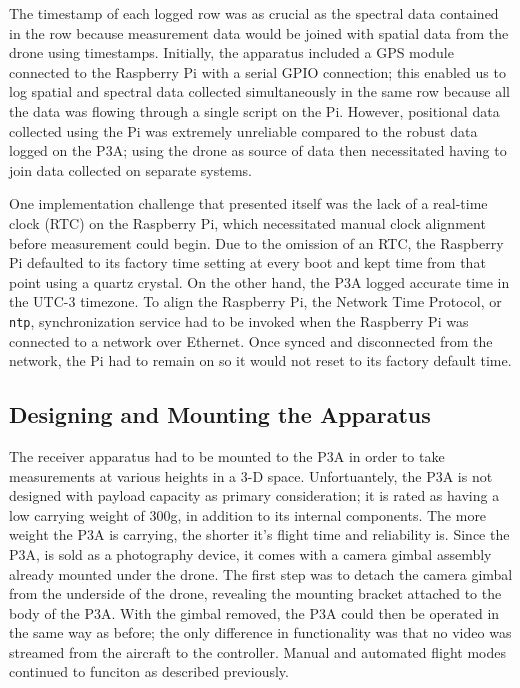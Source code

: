 \documentclass[pageno]{jpaper}
\begin{document}
The timestamp of each logged row was as crucial as the spectral data contained in the row because measurement data would be joined with spatial data from the drone using timestamps. Initially, the apparatus included a GPS module connected to the Raspberry Pi with a serial GPIO connection; this enabled us to log spatial and spectral data collected simultaneously in the same row because all the data was flowing through a single script on the Pi. However, positional data collected using the Pi was extremely unreliable compared to the robust data logged on the P3A; using the drone as source of data then necessitated having to join data collected on separate systems.

 One implementation challenge that presented itself was the lack of a real-time clock (RTC) on the Raspberry Pi, which necessitated manual clock alignment before measurement could begin. Due to the omission of an RTC, the Raspberry Pi defaulted to its factory time setting at every boot and kept time from that point using a quartz crystal. On the other hand, the P3A logged accurate time in the UTC-3 timezone. To align the Raspberry Pi, the Network Time Protocol, or \texttt{ntp}, synchronization service had to be invoked when the Raspberry Pi was connected to a network over Ethernet. Once synced and disconnected from the network, the Pi had to remain on so it would not reset to its factory default time. 

\subsection{Designing and Mounting the Apparatus}
The receiver apparatus had to be mounted to the P3A in order to take measurements at various heights in a 3-D space. Unfortuantely, the P3A is not designed with payload capacity as primary consideration; it is rated as having a low carrying weight of 300g, in addition to its internal components. The more weight the P3A is carrying, the shorter it's flight time and reliability is. Since the P3A, is sold as a photography device, it comes with a camera gimbal assembly already mounted under the drone. The first step was to detach the camera gimbal from the underside of the drone, revealing the mounting bracket attached to the body of the P3A. With the gimbal removed, the P3A could then be operated in the same way as before; the only difference in functionality was that no video was streamed from the aircraft to the controller. Manual and automated flight modes continued to funciton as described previously. 
\end{document}
